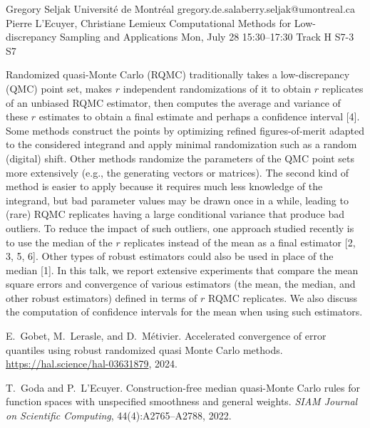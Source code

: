 \begin{talk}
  {Gregory Seljak}%
  {Universit\'e de Montr\'eal}%
  {gregory.de.salaberry.seljak@umontreal.ca}%
  {Pierre L'Ecuyer, Christiane Lemieux}%
  {Computational Methods for Low-discrepancy Sampling and Applications}%
  {}%
  {Mon, July 28 15:30–17:30 Track H}%
  {S7-3}%
  {S7}%

\medskip

Randomized quasi-Monte Carlo (RQMC) traditionally takes a low-discrepancy (QMC) point set,
makes $r$ independent randomizations of it to obtain $r$ replicates of an unbiased RQMC estimator, 
then computes the average and variance of these $r$ estimates to obtain a final estimate 
and perhaps a confidence interval [4]. 
Some methods construct the points by optimizing refined figures-of-merit adapted to the considered integrand
and apply minimal randomization such as a random (digital) shift.  Other methods randomize
the parameters of the QMC point sets more extensively (e.g., the generating vectors or matrices).
The second kind of method is easier to apply because it requires much less knowledge of the integrand,
but bad parameter values may be drawn once in a while, leading to (rare) RQMC replicates having 
a large conditional variance that produce bad outliers.
To reduce the impact of such outliers, one approach studied recently is to use the median 
of the $r$ replicates instead of the mean as a final estimator [2, 3, 5, 6].
Other types of robust estimators could also be used in place of the median [1].
In this talk, we report extensive experiments that compare the mean square errors 
and convergence of various estimators (the mean, the median, and other robust estimators) 
defined in terms of $r$ RQMC replicates.
We also discuss the computation of confidence intervals for the mean when using such estimators.

{
%
\item
E.~Gobet, M.~Lerasle, and D.~M{\'e}tivier.
Accelerated convergence of error quantiles using robust randomized
  quasi {Monte Carlo} methods.
\url{https://hal.science/hal-03631879}, 2024.

\item
T.~Goda and P.~L'Ecuyer.
Construction-free median quasi-{Monte Carlo} rules for function
  spaces with unspecified smoothness and general weights.
{\em {SIAM} Journal on Scientific Computing}, 44(4):A2765--A2788, 2022.

}
\end{talk}
